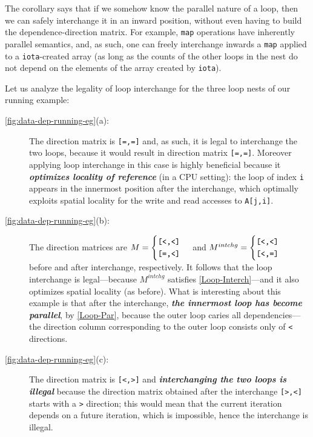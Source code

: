 \documentclass[acmsmall,review]{acmart}\settopmatter{printfolios=true,printccs=false,printacmref=false}
\begin{document}
The corollary says that if we somehow know the parallel nature
of a loop, then we can safely interchange it in an inward position,
without even having to build the dependence-direction matrix.
For example, \lstinline{map} operations have inherently parallel
semantics, and, as such, one can freely interchange inwards a
\lstinline{map} applied to a \lstinline{iota}-created array
(as long as the counts of the other loops in the nest do not
depend on the elements of the array created by \lstinline{iota}).

Let us analyze the legality of loop interchange for the three loop 
nests of our running example:
\begin{description}
\item[\cref{fig:data-dep-running-eg}(a):] The direction matrix
        is {\tt [=,=]} and, as such, it is legal to interchange
        the two loops, because it would result in direction
        matrix {\tt[=,=]}. Moreover applying loop interchange
        in this case is highly beneficial because it
        \textbf{\em optimizes locality of reference} (in a CPU setting): the 
        loop of index {\tt i} appears in the innermost position 
        after the interchange, which optimally exploits spatial 
        locality for the write and read accesses to {\tt A[j,i]}.
\item[\cref{fig:data-dep-running-eg}(b):] The direction matrices are
        $M = \begin{cases}\mbox{\tt[<,<]}\\\mbox{\tt[=,<]}\end{cases}$
        and
        $M^{intchg} = \begin{cases}\mbox{\tt[<,<]}\\\mbox{\tt[<,=]}\end{cases}$
        before and after interchange, respectively. 
        It follows that the loop interchange is legal---because 
        $M^{intchg}$ satisfies \cref{Loop-Interch}---and 
        it also optimizes spatial locality (as before).
        What is interesting about this example is that after the 
        interchange, \textbf{\em the innermost loop has become parallel},
        by \cref{Loop-Par}, because the outer loop caries
        all dependencies---the direction column corresponding to the
        outer loop consists only of {\tt<} directions.
\item[\cref{fig:data-dep-running-eg}(c):] The direction matrix is
        {\tt[<,>]} and \textbf{\em interchanging the two loops is illegal}
        because the direction matrix obtained after the interchange
        {\tt[>,<]} starts with a {\tt>} direction; this would
        mean that the current iteration depends on a future iteration,
        which is impossible, hence the interchange is illegal.
\end{description}
\end{document}
